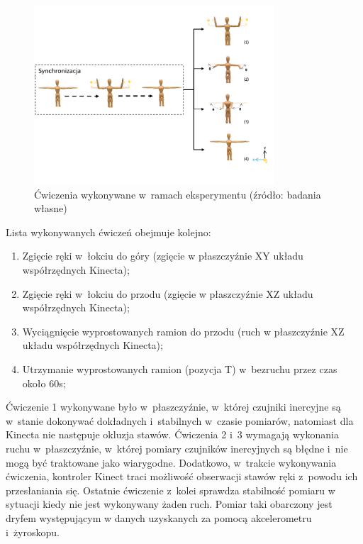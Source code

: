 	\begin{figure}[!htb]
		\centering
		\includegraphics[width=0.8\textwidth]{images/poses.png}
		\caption{Ćwiczenia wykonywane w~ramach eksperymentu  (źródło: badania własne)}
		\label{fig:experiments:poses}
	\end{figure}
						
Lista wykonywanych ćwiczeń obejmuje kolejno:
\begin{enumerate}
	\item Zgięcie ręki w~łokciu do góry (zgięcie w płaszczyźnie XY układu współrzędnych Kinecta); \\
	\item Zgięcie ręki w~łokciu do przodu (zgięcie w płaszczyźnie XZ układu współrzędnych Kinecta); \\
	\item Wyciągnięcie wyprostowanych ramion do przodu (ruch w płaszczyźnie XZ układu współrzędnych Kinecta); \\
	\item Utrzymanie wyprostowanych ramion (pozycja T) w~bezruchu przez czas około 60s; \\
\end{enumerate}
						
Ćwiczenie 1 wykonywane było w~płaszczyźnie, w~której czujniki inercyjne są w~stanie dokonywać dokładnych i~stabilnych w~czasie pomiarów, natomiast dla Kinecta nie następuje okluzja stawów. Ćwiczenia 2 i~3 wymagają wykonania ruchu w~płaszczyźnie, w~której pomiary czujników inercyjnych są błędne i~nie mogą być traktowane jako wiarygodne. Dodatkowo, w~trakcie wykonywania ćwiczenia, kontroler Kinect traci możliwość obserwacji stawów ręki z~powodu ich przesłaniania się. Ostatnie ćwiczenie z~kolei sprawdza stabilność pomiaru w sytuacji kiedy nie jest wykonywany żaden ruch. Pomiar taki obarczony jest dryfem występującym w danych uzyskanych za pomocą akcelerometru i~żyroskopu.
						
